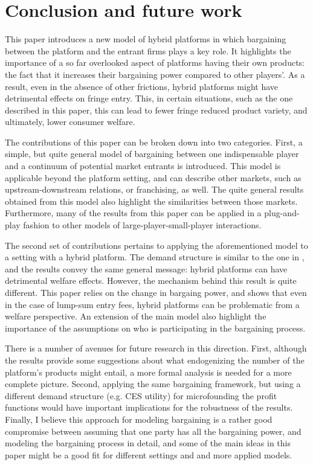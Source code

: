 \documentclass[a4paper]{article}
\begin{document}
\section{Conclusion and future work}
\label{sec:conclusion}

This paper introduces a new model of hybrid platforms in which bargaining between the platform and the entrant firms plays a key role.
It highlights the importance of a so far overlooked aspect of platforms having their own products: the fact that it increases their bargaining power compared to other players'.
As a result, even in the absence of other frictions, hybrid platforms might have detrimental effects on fringe entry.
This, in certain situations, such as the one described in this paper, this can lead to fewer fringe reduced product variety, and ultimately, lower consumer welfare.

The contributions of this paper can be broken down into two categories.
First, a simple, but quite general model of bargaining between one indispensable player and a continuum of potential market entrants is introduced.
This model is applicable beyond the platform setting, and can describe other markets, such as upstream-downstream relations, or franchising, as well.
The quite general results obtained from this model also highlight the similarities between those markets.
Furthermore, many of the results from this paper can be applied in a plug-and-play fashion to other models of large-player-small-player interactions.

The second set of contributions pertains to applying the aforementioned model to a setting with a hybrid platform.
The demand structure is similar to the one in \textcite{anderson2021hybrid}, and the results convey the same general message: hybrid platforms can have detrimental welfare effects.
However, the mechanism behind this result is quite different.
This paper relies on the change in bargaing power, and shows that even in the case of lump-sum entry fees, hybrid platforms can be problematic from a welfare perspective.
An extension of the main model also highlight the importance of the assumptions on who is participating in the bargaining process.

There is a number of avenues for future research in this direction.
First, although the results provide some suggestions about what endogenizing the number of the platform's products might entail, a more formal analysis is needed for a more complete picture.
Second, applying the same bargaining framework, but using a different demand structure (e.g. CES utility) for microfounding the profit functions would have important implications for the robustness of the results.
Finally, I believe this approach for modeling bargaining is a rather good compromise between assuming that one party has all the bargaining power, and modeling the bargaining process in detail, and some of the main ideas in this paper might be a good fit for different settings and and more applied models.
\end{document}
